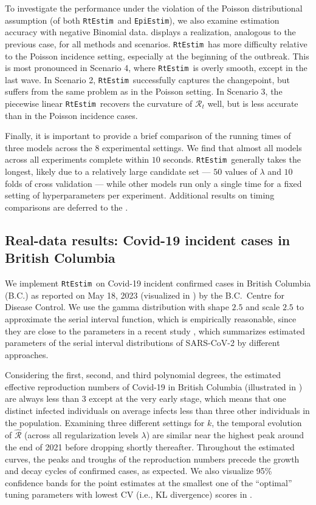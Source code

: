 \documentclass[10pt,letterpaper]{article}
\def\RtEstim{\texttt{RtEstim}}
\def\EpiEstim{\texttt{EpiEstim}}
\def\calR{\mathcal{R}}
\newcommand{\citep}[1]{\cite{#1}}
\begin{document}
To investigate the performance under the violation of the Poisson distributional
assumption (of both \RtEstim\ and \EpiEstim), we also examine estimation
accuracy with negative Binomial data.  displays a
realization, analogous to the previous case, for all methods and scenarios.
\RtEstim\ has more difficulty relative to the Poisson incidence setting,
especially at the beginning of the outbreak. This is most pronounced in Scenario
4, where \RtEstim\ is overly smooth, except in the last wave. In Scenario 2,
\RtEstim\ successfully captures the changepoint, but suffers from the same
problem as in the Poisson setting. In Scenario 3, the piecewise linear \RtEstim\
recovers the curvature of $\calR_t$ well, but is less accurate than
in the Poisson incidence cases.


Finally, it is important to provide a brief comparison of the running times of
three models across the $8$ experimental settings. We find that almost all
models across all experiments complete within $10$ seconds.
\RtEstim\ generally takes the longest, likely due to a relatively large
candidate set --- $50$ values of $\lambda$ and $10$ folds of cross validation --- 
while other models run only a single time for a fixed setting of hyperparameters 
per experiment. Additional results on timing comparisons are deferred to the
\nameref{Appendix}. 


\subsection{Real-data results: Covid-19 incident cases in British Columbia}

We implement \RtEstim\ on Covid-19 incident confirmed cases in British Columbia
(B.C.) as reported on May 18, 2023 (visualized in \nameref{fig:covid-data}) by
the B.C.\ Centre for Disease Control. 
We use the gamma distribution with shape $2.5$ and scale $2.5$
to approximate the serial interval function, which is empirically
reasonable, since they are close to the parameters in a recent study 
\citep{lehtinen2021relationship}, which summarizes estimated parameters of the 
serial interval distributions of SARS-CoV-2 by different approaches. 


Considering the first, second, and third polynomial degrees, the estimated 
effective reproduction numbers of Covid-19 in British Columbia
(illustrated in ) are always less than $3$ except at the 
very early stage, which means that one distinct infected individuals on average 
infects less than three other individuals in the population. 
Examining three different settings for $k$, 
the temporal evolution of $\widehat{\calR}$ (across all regularization levels
$\lambda$) are similar near the highest peak around the end of 2021 before
dropping shortly thereafter. Throughout the estimated curves, the peaks and
troughs of the reproduction numbers precede the growth and decay cycles of
confirmed cases, as expected. We also visualize 95\% confidence bands for the
point estimates at the smallest one of the ``optimal'' tuning parameters with 
lowest CV (i.e., KL divergence) scores in \nameref{fig:covid-rt}.     
\end{document}
